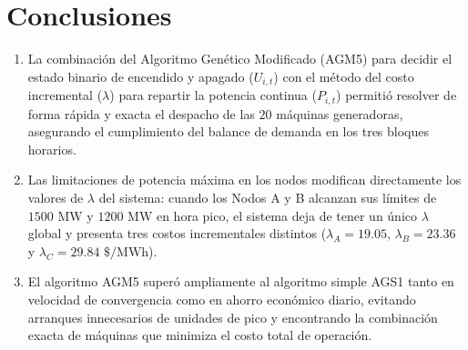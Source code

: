 \documentclass[11pt,letterpaper]{article}
\begin{document}
\section{Conclusiones}

\begin{enumerate}
    \item La combinación del Algoritmo Genético Modificado (AGM5) para decidir el estado binario de encendido y apagado ($U_{i,t}$) con el método del costo incremental ($\lambda$) para repartir la potencia continua ($P_{i,t}$) permitió resolver de forma rápida y exacta el despacho de las $20$ máquinas generadoras, asegurando el cumplimiento del balance de demanda en los tres bloques horarios.
    \item Las limitaciones de potencia máxima en los nodos modifican directamente los valores de $\lambda$ del sistema: cuando los Nodos A y B alcanzan sus límites de $1500\text{ MW}$ y $1200\text{ MW}$ en hora pico, el sistema deja de tener un único $\lambda$ global y presenta tres costos incrementales distintos ($\lambda_A = 19.05$, $\lambda_B = 23.36$ y $\lambda_C = 29.84\text{ \$/MWh}$).
    \item El algoritmo AGM5 superó ampliamente al algoritmo simple AGS1 tanto en velocidad de convergencia como en ahorro económico diario, evitando arranques innecesarios de unidades de pico y encontrando la combinación exacta de máquinas que minimiza el costo total de operación.
\end{enumerate}
\end{document}
